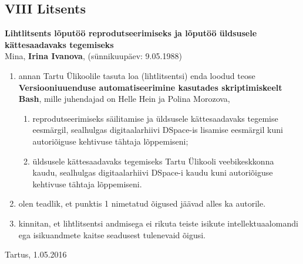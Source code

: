 \documentclass[12pt]{article}
\begin{document}
  \newpage

  \subsection*{VIII Litsents}
  \label{licence}
  
  \textbf{Lihtlitsents lõputöö reprodutseerimiseks ja lõputöö üldsusele kättesaadavaks tegemiseks}\\
  
  Mina, \textbf{Irina Ivanova}, (sünnikuupäev: 9.05.1988)
  \begin{enumerate}
    \item annan Tartu Ülikoolile tasuta loa (lihtlitsentsi) enda loodud teose \textbf{Versiooniuuenduse automatiseerimine kasutades skriptimiskeelt Bash}, mille juhendajad on Helle Hein ja Polina Morozova,
    \begin{enumerate}
      \item reprodutseerimiseks säilitamise ja üldsusele kättesaadavaks tegemise eesmärgil, sealhulgas digitaalarhiivi DSpace-is lisamise eesmärgil kuni autoriõiguse kehtivuse tähtaja lõppemiseni;
      \item üldsusele kättesaadavaks tegemiseks Tartu Ülikooli veebikeskkonna kaudu, sealhulgas digitaalarhiivi DSpace-i kaudu kuni autoriõiguse kehtivuse tähtaja lõppemiseni.
    \end{enumerate}
    \item olen teadlik, et punktis 1 nimetatud õigused jäävad alles ka autorile.
    \item kinnitan, et lihtlitsentsi andmisega ei rikuta teiste isikute intellektuaalomandi ega isikuandmete kaitse seadusest tulenevaid õigusi.
  \end{enumerate}
  
  Tartus, 1.05.2016
\end{document}
